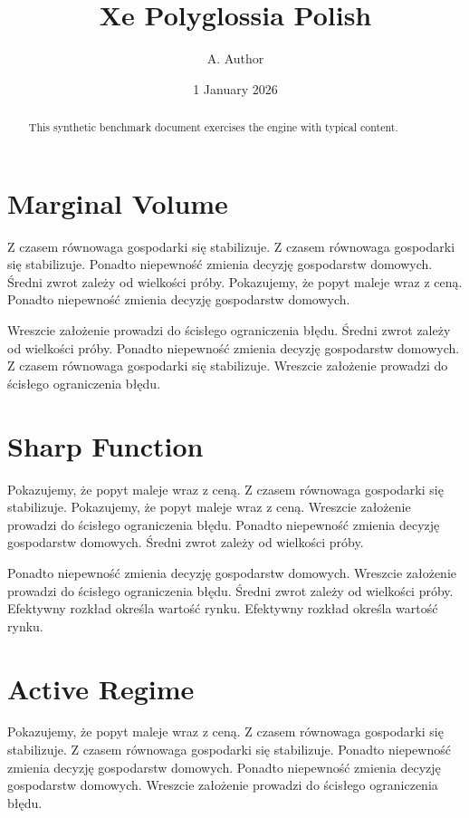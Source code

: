 \documentclass[11pt]{article}
\title{Xe Polyglossia Polish}
\author{A. Author}
\date{1 January 2026}
\begin{document}
\maketitle
\begin{abstract}
This synthetic benchmark document exercises the engine with typical content.
\end{abstract}
\tableofcontents
\section{Marginal Volume}\label{sec:1}

Z czasem równowaga gospodarki się stabilizuje. Z czasem równowaga gospodarki się stabilizuje. Ponadto niepewność zmienia decyzję gospodarstw domowych. Średni zwrot zależy od wielkości próby. Pokazujemy, że popyt maleje wraz z ceną. Ponadto niepewność zmienia decyzję gospodarstw domowych.

Wreszcie założenie prowadzi do ścisłego ograniczenia błędu. Średni zwrot zależy od wielkości próby. Ponadto niepewność zmienia decyzję gospodarstw domowych. Z czasem równowaga gospodarki się stabilizuje. Wreszcie założenie prowadzi do ścisłego ograniczenia błędu.

\section{Sharp Function}\label{sec:2}

Pokazujemy, że popyt maleje wraz z ceną. Z czasem równowaga gospodarki się stabilizuje. Pokazujemy, że popyt maleje wraz z ceną. Wreszcie założenie prowadzi do ścisłego ograniczenia błędu. Ponadto niepewność zmienia decyzję gospodarstw domowych. Średni zwrot zależy od wielkości próby.

Ponadto niepewność zmienia decyzję gospodarstw domowych. Wreszcie założenie prowadzi do ścisłego ograniczenia błędu. Średni zwrot zależy od wielkości próby. Efektywny rozkład określa wartość rynku. Efektywny rozkład określa wartość rynku.

\section{Active Regime}\label{sec:3}

Pokazujemy, że popyt maleje wraz z ceną. Z czasem równowaga gospodarki się stabilizuje. Z czasem równowaga gospodarki się stabilizuje. Ponadto niepewność zmienia decyzję gospodarstw domowych. Ponadto niepewność zmienia decyzję gospodarstw domowych. Wreszcie założenie prowadzi do ścisłego ograniczenia błędu.
\end{document}
